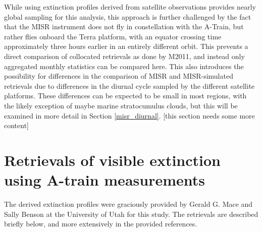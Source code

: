 While using extinction profiles derived from satellite observations provides nearly global sampling for this analysis, this approach is further challenged by the fact that the MISR instrument does not fly in constellation with the A-Train, but rather flies onboard the Terra platform, with an equator crossing time approximately three hours earlier in an entirely different orbit. This prevents a direct comparison of collocated retrievals as done by M2011, and instead only aggregated monthly statistics can be compared here. This also introduces the possibility for differences in the comparison of MISR and MISR-simulated retrievals due to differences in the diurnal cycle sampled by the different satellite platforms. These differences can be expected to be small in most regions, with the likely exception of maybe marine stratocumulus clouds, but this will be examined in more detail in Section \ref{misr_diurnal}.
[this section needs some more content]

\section{Retrievals of visible extinction using A-train measurements}
\label{cc_retrievals}

The derived extinction profiles were graciously provided by Gerald G. Mace and Sally Benson at the University of Utah for this study. The retrievals are described briefly below, and more extensively in the provided references. 

